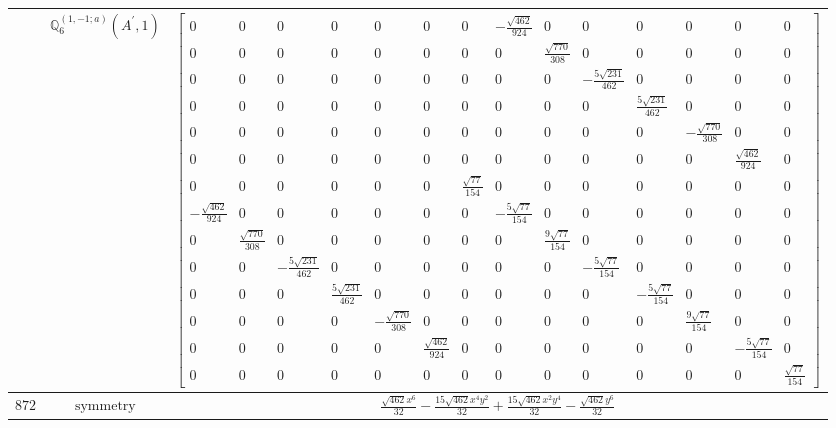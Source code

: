 \documentclass[fleqn,8pt,landscape]{jsarticle}
\begin{document}
\begin{longtable}{ccc}
$  $ & $ \mathbb{Q}_{6}^{(1,-1;a)}(A^{\prime},1) $ & $ \begin{bmatrix} 0 & 0 & 0 & 0 & 0 & 0 & 0 & - \frac{\sqrt{462}}{924} & 0 & 0 & 0 & 0 & 0 & 0 \\ 0 & 0 & 0 & 0 & 0 & 0 & 0 & 0 & \frac{\sqrt{770}}{308} & 0 & 0 & 0 & 0 & 0 \\ 0 & 0 & 0 & 0 & 0 & 0 & 0 & 0 & 0 & - \frac{5 \sqrt{231}}{462} & 0 & 0 & 0 & 0 \\ 0 & 0 & 0 & 0 & 0 & 0 & 0 & 0 & 0 & 0 & \frac{5 \sqrt{231}}{462} & 0 & 0 & 0 \\ 0 & 0 & 0 & 0 & 0 & 0 & 0 & 0 & 0 & 0 & 0 & - \frac{\sqrt{770}}{308} & 0 & 0 \\ 0 & 0 & 0 & 0 & 0 & 0 & 0 & 0 & 0 & 0 & 0 & 0 & \frac{\sqrt{462}}{924} & 0 \\ 0 & 0 & 0 & 0 & 0 & 0 & \frac{\sqrt{77}}{154} & 0 & 0 & 0 & 0 & 0 & 0 & 0 \\ - \frac{\sqrt{462}}{924} & 0 & 0 & 0 & 0 & 0 & 0 & - \frac{5 \sqrt{77}}{154} & 0 & 0 & 0 & 0 & 0 & 0 \\ 0 & \frac{\sqrt{770}}{308} & 0 & 0 & 0 & 0 & 0 & 0 & \frac{9 \sqrt{77}}{154} & 0 & 0 & 0 & 0 & 0 \\ 0 & 0 & - \frac{5 \sqrt{231}}{462} & 0 & 0 & 0 & 0 & 0 & 0 & - \frac{5 \sqrt{77}}{154} & 0 & 0 & 0 & 0 \\ 0 & 0 & 0 & \frac{5 \sqrt{231}}{462} & 0 & 0 & 0 & 0 & 0 & 0 & - \frac{5 \sqrt{77}}{154} & 0 & 0 & 0 \\ 0 & 0 & 0 & 0 & - \frac{\sqrt{770}}{308} & 0 & 0 & 0 & 0 & 0 & 0 & \frac{9 \sqrt{77}}{154} & 0 & 0 \\ 0 & 0 & 0 & 0 & 0 & \frac{\sqrt{462}}{924} & 0 & 0 & 0 & 0 & 0 & 0 & - \frac{5 \sqrt{77}}{154} & 0 \\ 0 & 0 & 0 & 0 & 0 & 0 & 0 & 0 & 0 & 0 & 0 & 0 & 0 & \frac{\sqrt{77}}{154} \end{bmatrix} $ \\ \hline
$ 872 $ & $ \text{symmetry} $ & $ \frac{\sqrt{462} x^{6}}{32} - \frac{15 \sqrt{462} x^{4} y^{2}}{32} + \frac{15 \sqrt{462} x^{2} y^{4}}{32} - \frac{\sqrt{462} y^{6}}{32} $ \\

\end{longtable}
\end{document}
